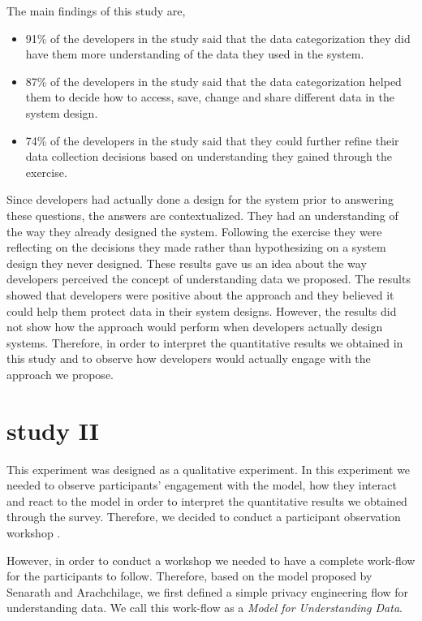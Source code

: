\documentclass{sigchi}
\begin{document}
The main findings of this study are,

\begin{itemize}
\item 91\% of the developers in the study said that the data categorization they did have them more understanding of the data they used in the system. 
\item 87\% of the developers in the study said that the data categorization helped them to decide how to access, save, change and share different data in the system design.
\item 74\% of the developers in the study said that they could further refine their data collection decisions based on understanding they gained through the exercise.
\end {itemize}

Since developers had actually done a design for the system prior to answering these questions, the answers are contextualized. They had an understanding of the way they already designed the system. Following the exercise they were reflecting on the decisions they made rather than hypothesizing on a system design they never designed. These results gave us an idea about the way developers perceived the concept of understanding data we proposed. The results showed that developers were positive about the approach and they believed it could help them protect data in their system designs. However, the results did not show how the approach would perform when developers actually design systems. Therefore, in order to interpret the quantitative results we obtained in this study and to observe how developers would actually engage with the approach we propose.

\section{study II}

This experiment was designed as a qualitative experiment. In this experiment we needed to observe participants' engagement with the model, how they interact and react to the model in order to interpret the quantitative results we obtained through the survey. Therefore, we decided to conduct a participant observation workshop \cite {venable2016feds, gregor2013positioning}. 

However, in order to conduct a workshop we needed to have a complete work-flow for the participants to follow. Therefore, based on the model proposed by Senarath and Arachchilage, we first defined a simple privacy engineering flow for understanding data. We call this work-flow as a \textit{Model for Understanding Data}.
\end{document}
